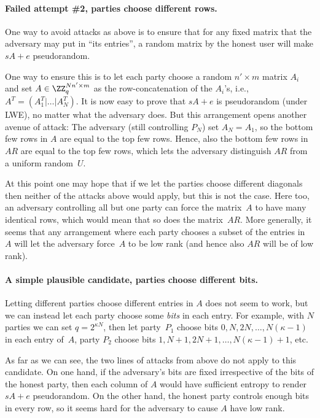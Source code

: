 \paragraph{Failed attempt \#2, parties choose different rows.}
One way to avoid attacks as above is to ensure that for any fixed matrix that the adversary may put in ``its entries'', a random matrix by the honest user will make $sA+e$ pseudorandom.

One way to ensure this is to let each party choose a random $n'\times m$ matrix $A_i$ and set $A\in\ZZ_q^{Nn'\times m}$ as the row-concatenation of the $A_i$'s, i.e., $A^T=(A_1^T|\ldots|A_N^T)$. It is now easy to prove that $sA+e$ is pseudorandom (under LWE), no matter what the adversary does. But this arrangement opens another avenue of attack: The adversary (still controlling $P_N$) set $A_N=A_1$, so the bottom few rows in $A$ are equal to the top few rows. Hence, also the bottom few rows in $AR$ are equal to the top few rows, which lets the adversary distinguish $AR$ from a uniform random~$U$.

At this point one may hope that if we let the parties choose different diagonals then neither of the attacks above would apply, but this is not the case. Here too, an adversary controlling all but one party can force the matrix~$A$ to have many identical rows, which would mean that so does the matrix~$AR$. More generally, it seems that any arrangement where each party chooses a subset of the entries in~$A$ will let the adversary force~$A$ to be low rank (and hence also $AR$ will be of low rank).

\paragraph{A simple plausible candidate, parties choose different bits.}
Letting different parties choose different entries in $A$ does not seem to work, but we can instead let each party choose some \emph{bits} in each entry. For example, with $N$ parties we can set $q=2^{\kappa N}$, then let party~$P_1$ choose bits $0,N,2N,\ldots,N(\kappa-1)$ in each entry of~$A$, party $P_2$ choose bits $1,N+1,2N+1,\ldots,N(\kappa-1)+1$, etc.

As far as we can see, the two lines of attacks from above do not apply to this candidate. On one hand, if the adversary's bits are fixed irrespective of the bits of the honest party, then each column of $A$ would have sufficient entropy to render $sA+e$ pseudorandom. On the other hand, the honest party controls enough bits in every row, so it seems hard for the adversary to cause $A$ have low rank.

